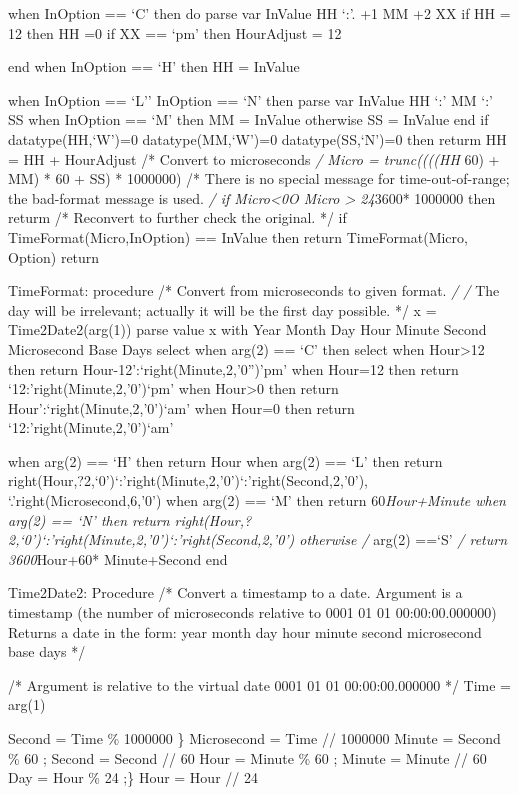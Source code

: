 when InOption == `C' then do parse var InValue HH `:'. +1 MM +2 XX if HH
= 12 then HH =0 if XX == `pm' then HourAdjust = 12

end when InOption == `H' then HH = InValue

when InOption == `L'' \textbar{} InOption == `N' then parse var InValue
HH `:' MM `:' SS when InOption == `M' then MM = InValue otherwise SS =
InValue end if datatype(HH,`W')=0 \textbar{} datatype(MM,`W')=0
\textbar{} datatype(SS,`N')=0 then returm HH = HH + HourAdjust /*
Convert to microseconds \emph{/ Micro = trunc((((HH } 60) + MM) * 60 +
SS) * 1000000) /* There is no special message for time-out-of-range; the
bad-format message is used. \emph{/ if Micro\textless0O \textbar{} Micro
\textgreater{} 24}3600* 1000000 then returm /* Reconvert to further
check the original. */ if TimeFormat(Micro,InOption) == InValue then
return TimeFormat(Micro, Option) return

TimeFormat: procedure /* Convert from microseconds to given format.
\emph{/ /} The day will be irrelevant; actually it will be the first day
possible. */ x = Time2Date2(arg(1)) parse value x with Year Month Day
Hour Minute Second Microsecond Base Days select when arg(2) == `C' then
select when Hour\textgreater12 then return
Hour-12':`right(Minute,2,'0'')'pm' when Hour=12 then return
`12:'right(Minute,2,'0')`pm' when Hour\textgreater0 then return
Hour':`right(Minute,2,'0')`am' when Hour=0 then return
`12:'right(Minute,2,'0')`am'

when arg(2) == `H' then return Hour when arg(2) == `L' then return
right(Hour,?2,`0')`:'right(Minute,2,'0')`:'right(Second,2,'0'),
\textbar\textbar{} `.'right(Microsecond,6,'0') when arg(2) == `M' then
return 60\emph{Hour+Minute when arg(2) == `N' then return
right(Hour,?2,`0')`:'right(Minute,2,'0')`:'right(Second,2,'0') otherwise
/} arg(2) ==`S' \emph{/ return 3600}Hour+60* Minute+Second end

Time2Date2: Procedure /* Convert a timestamp to a date. Argument is a
timestamp (the number of microseconds relative to 0001 01 01
00:00:00.000000) Returns a date in the form: year month day hour minute
second microsecond base days */

/* Argument is relative to the virtual date 0001 01 01 00:00:00.000000
*/ Time = arg(1)

Second = Time \% 1000000 \} Microsecond = Time // 1000000 Minute =
Second \% 60 ; Second = Second // 60 Hour = Minute \% 60 ; Minute =
Minute // 60 Day = Hour \% 24 ;\} Hour = Hour // 24


